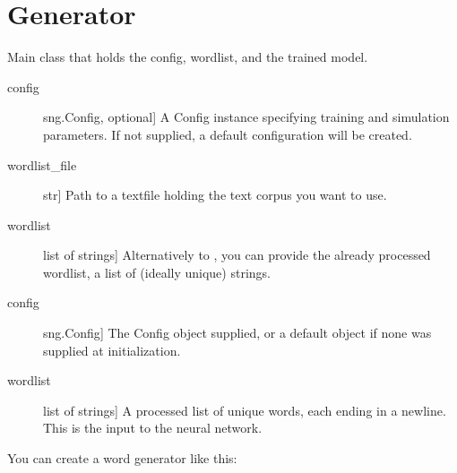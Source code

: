 \documentclass[letterpaper,10pt,english]{sphinxmanual}
\begin{document}
\section{Generator}
\label{\detokenize{modules:module-sng.Generator}}\label{\detokenize{modules:generator}}

\begin{fulllineitems}
\label{\detokenize{modules:sng.Generator.Generator}}
Main class that holds the config, wordlist, and the trained model.
\begin{description}
\item[{config}] \leavevmode{[}sng.Config, optional{]}
A Config instance specifying training and simulation parameters.
If not supplied, a default configuration will be created.

\item[{wordlist\_file}] \leavevmode{[}str{]}
Path to a textfile holding the text corpus you want to use.

\item[{wordlist}] \leavevmode{[}list of strings{]}
Alternatively to , you can provide the already
processed wordlist, a list of (ideally unique) strings.

\end{description}
\begin{description}
\item[{config}] \leavevmode{[}sng.Config{]}
The Config object supplied, or a default object if none was supplied
at initialization.

\item[{wordlist}] \leavevmode{[}list of strings{]}
A processed list of unique words, each ending in a newline.
This is the input to the neural network.

\end{description}

You can create a word generator like this:

%
\begin{sphinxVerbatim}[commandchars=\\\{\}]
 
  


\end{sphinxVerbatim}
\end{fulllineitems}
\end{document}

